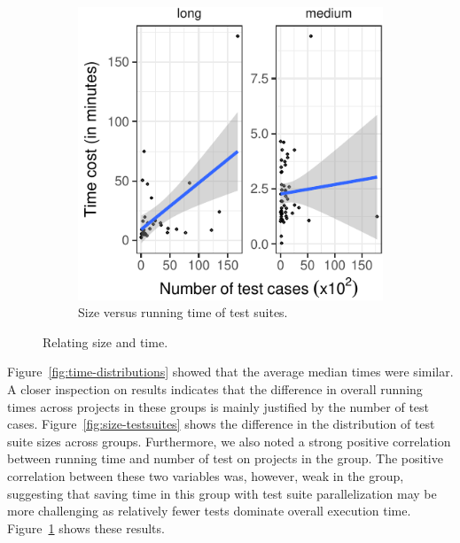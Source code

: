 \begin{figure}[t]
\begin{subfigure}{0.3\textwidth}
    \includegraphics[width=.95\textwidth]{plots/scatter-testcost.pdf}
    \caption{\label{fig:scattercost}Size versus running time of
      test suites.}
  \end{subfigure}
  \caption{\label{fig:time-versus-size}Relating size and time.}%
\end{figure}

Figure~\ref{fig:time-distributions} showed that the average median
times were similar.  A closer inspection on results indicates that the
difference in overall running times across projects in these groups is
mainly justified by the number of test cases.
Figure~\ref{fig:size-testsuites} shows the difference in the
distribution of test suite sizes across groups. Furthermore,
we also noted a strong positive correlation between running time and
number of test on projects in the \longg{} group.  The positive
correlation between these two variables was, however, weak in the
\medg{} group, suggesting that saving time in this group with test
suite parallelization may be more challenging as relatively fewer
tests dominate overall execution time.  Figure~\ref{fig:scattercost}
shows these results.


\begin{center}
\end{center}


